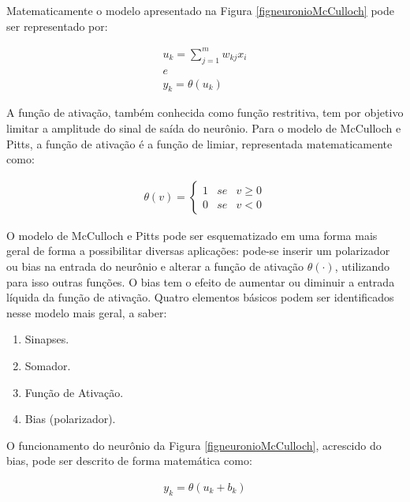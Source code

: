 Matematicamente o modelo apresentado na Figura \ref{figneuronioMcCulloch} pode ser representado por:

\begin{equation} \label{eqRNA6}
\begin{split}
u_k = \sum_{j=1}^{m} w_{kj} x_i
\\ e
\\ y_k = \theta(u_k)
\end{split}
\end{equation}

A função de ativação, também conhecida como função restritiva, tem por objetivo limitar a amplitude do sinal de saída do neurônio. Para o modelo de McCulloch e Pitts, a função de ativação é a função de limiar, representada matematicamente como:

\begin{equation} \label{eqRNA7}
\begin{split}
\theta(v) = \left\{ \begin{array}{rcl}1 & se & v\ge0
\\ 0 & se & v<0
\end{array}\right.
\end{split}
\end{equation}

O modelo de McCulloch e Pitts pode ser esquematizado em uma forma mais geral de forma a possibilitar diversas aplicações: pode-se inserir um polarizador ou bias na entrada do neurônio e alterar a função de ativação \( \theta(·)\), utilizando para isso outras funções. O bias tem o efeito de aumentar ou diminuir a entrada líquida da função de ativação. Quatro elementos básicos podem ser identificados nesse modelo mais geral, a saber:

\begin{enumerate}
    \item Sinapses.
    \item Somador.
    \item Função de Ativação.
    \item Bias (polarizador).
\end{enumerate}

O funcionamento do neurônio da Figura \ref{figneuronioMcCulloch}, acrescido do bias, pode ser descrito de forma matemática como:

\begin{equation} \label{eqRNA8}
\begin{split}
y_k = \theta(u_k + b_k)
\end{split}
\end{equation}

